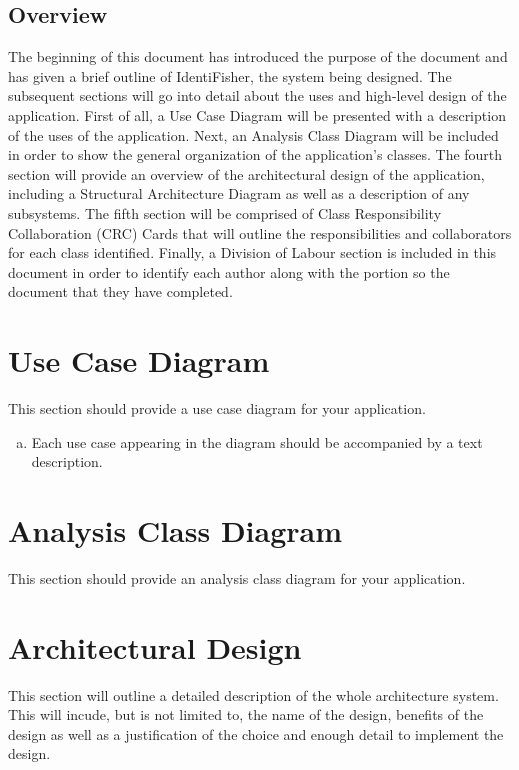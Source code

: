 \documentclass[]{article}
\begin{document}
\subsection{Overview}
\label{sub:overview}
	The beginning of this document has introduced the purpose of the document and has given a brief outline of IdentiFisher, the system being designed. The subsequent sections will go into detail about the uses and high-level design of the application. First of all, a Use Case Diagram will be presented with a description of the uses of the application. Next, an Analysis Class Diagram will be included in order to show the general organization of the application's classes. The fourth section will provide an overview of the architectural design of the application, including a Structural Architecture Diagram as well as a description of any subsystems. The fifth section will be comprised of Class Responsibility Collaboration (CRC) Cards that will outline the responsibilities and collaborators for each class identified. Finally, a Division of Labour section is included in this document in order to identify each author along with the portion so the document that they have completed. 


\section{Use Case Diagram}
\label{sec:use_case_diagram}
This section should provide a use case diagram for your application. 
\begin{enumerate}[a)]
	\item Each use case appearing in the diagram should be accompanied by a text description. 
\end{enumerate}

\section{Analysis Class Diagram}
\label{sec:analysis_class_diagram}
This section should provide an analysis class diagram for your application.

\section{Architectural Design}
\label{sec:architectural_design}
This section will outline a detailed description of the whole architecture system. This will incude, but is not limited to, the name of the design, benefits of the design as well as a justification of the choice and enough detail to implement the design.
\end{document}
